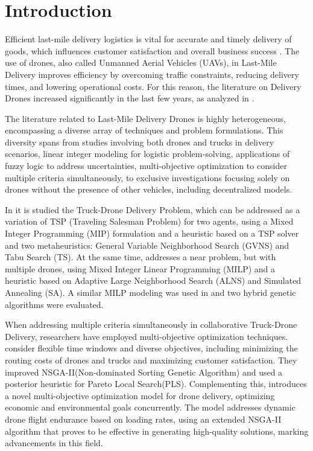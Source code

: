 
\chapter[Introduction]{Introduction}
\label{Introdução}

Efficient last-mile delivery logistics is vital for accurate and timely delivery of goods, which influences customer satisfaction and overall business success \cite{boysen2021lastmile}. The use of drones, also called Unmanned Aerial Vehicles (UAVs), in Last-Mile Delivery improves efficiency by overcoming traffic constraints, reducing delivery times, and lowering operational costs.  For this reason, the literature on Delivery Drones increased significantly in the last few years, as analyzed in .

The literature related to Last-Mile Delivery Drones is highly heterogeneous, encompassing a diverse array of techniques and problem formulations. This diversity spans from studies involving both drones and trucks in delivery scenarios, linear integer modeling for logistic problem-solving, applications of fuzzy logic to address uncertainties, multi-objective optimization to consider multiple criteria simultaneously, to exclusive investigations focusing solely on drones without the presence of other vehicles, including decentralized models.

In  it is studied the Truck-Drone Delivery Problem, which can be addressed as a variation of TSP (Traveling Salesman Problem) for two agents, using a Mixed Integer Programming (MIP) formulation and a heuristic based on a TSP solver and two metaheuristics: General Variable Neighborhood Search (GVNS) and Tabu Search (TS). At the same time,  addresses a near problem, but with multiple drones, using Mixed Integer Linear Programming (MILP) and a heuristic based on Adaptive Large Neighborhood Search (ALNS) and Simulated Annealing (SA). A similar MILP modeling was used in  and two hybrid genetic algorithms were evaluated.



When addressing multiple criteria simultaneously in collaborative Truck-Drone Delivery, researchers have employed multi-objective optimization techniques.   consider flexible time windows and diverse objectives, including minimizing the routing costs of drones and trucks and maximizing customer satisfaction. They improved NSGA-II(Non-dominated Sorting Genetic Algorithm) and used a posterior heuristic for Pareto Local Search(PLS).   Complementing this,  introduces a novel multi-objective optimization model for drone delivery, optimizing economic and environmental goals concurrently. The model addresses dynamic drone flight endurance based on loading rates, using an extended NSGA-II algorithm that proves to be effective in generating high-quality solutions, marking advancements in this field.

